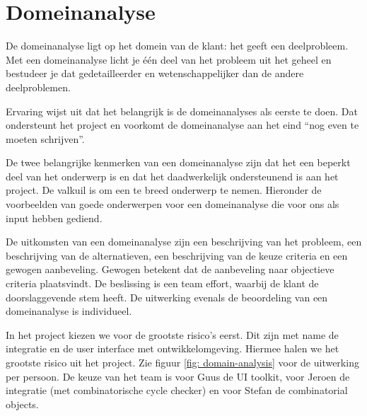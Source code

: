 
\section{Domeinanalyse}

De domeinanalyse ligt op het domein van de klant: het geeft een deelprobleem.
Met een domeinanalyse licht je \'e\'en deel van het probleem uit het geheel
en bestudeer je dat gedetailleerder en wetenschappelijker dan de andere
deelproblemen.

Ervaring wijst uit dat het belangrijk is de domeinanalyses als eerste te doen.
Dat ondersteunt het project en voorkomt
de domeinanalyse aan het eind ``nog even te moeten schrijven''.

De twee belangrijke kenmerken van een domeinanalyse zijn dat het een beperkt
deel van het onderwerp is en dat het daadwerkelijk
ondersteunend is aan het project. De valkuil is om een te breed onderwerp te
nemen. Hieronder de voorbeelden van goede onderwerpen
voor een domeinanalyse die voor ons als input hebben gediend.

De uitkomsten van een domeinanalyse zijn een beschrijving van het probleem,
een beschrijving van de alternatieven, een beschrijving van de keuze criteria en
een gewogen aanbeveling. Gewogen betekent dat de aanbeveling naar objectieve
criteria plaatsvindt. De beslissing is een team effort, waarbij de klant
de doorslaggevende stem heeft. De uitwerking evenals de beoordeling van
een domeinanalyse is individueel.

In het project kiezen we voor de grootste risico's eerst. Dit zijn met name
de integratie en de user interface met ontwikkelomgeving.
Hiermee halen we het grootste risico uit het project. Zie figuur \ref{fig: domain-analysis}
voor de uitwerking per persoon. De keuze van het team is voor Guus de UI toolkit,
voor Jeroen de integratie (met combinatorische cycle checker) en voor Stefan de
combinatorial objects.

